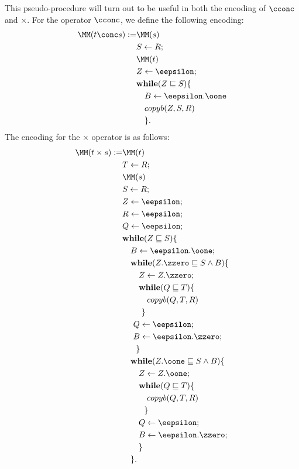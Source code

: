 This pseudo-procedure will turn out to be useful
in both the encoding of
{$\cconc$} and $\times$.
For the operator
{$\cconc$},
we define the following encoding:
\begin{align*}
\MM(t\conc s) := &\MM(s) \\
%
& S\leftarrow R; \\
%
& \MM(t) \\
%
& Z \leftarrow {\eepsilon}; \\
%
& \mathbf{while}(Z\sqsubseteq S)\{ \\
& \ \ \ B\leftarrow {\eepsilon.\oone} \\
& \ \ \ copyb(Z,S,R) \\
& \ \ \ \}.
\end{align*}
%
%
%
The encoding for the $\times$ operator is
as follows:
\begin{align*}
\MM(t\times s) := &\MM(t) \\
%
&T \leftarrow R; \\
%
& \MM(s) \\
%
& S \leftarrow R; \\
%
& Z \leftarrow {\eepsilon}; \\
%
&R \leftarrow {\eepsilon}; \\
%
&Q \leftarrow {\eepsilon}; \\
%
& \mathbf{while}(Z\sqsubseteq S) \{ \\
%
& \ \ \ B \leftarrow {\eepsilon.\oone}; \\
%
& \ \ \ \mathbf{while}(Z.{\zzero}
\sqsubseteq S\wedge B) \{ \\
%
& \ \ \ \ \ \ Z \leftarrow Z.{\zzero}; \\
%
& \ \ \ \ \ \ \mathbf{while}(Q\sqsubseteq T)\{ \\
%
& \ \ \ \ \ \ \ \ \ copyb(Q,T,R) \\
%
& \ \ \ \ \ \ \ \} \\
%
& \ \ \ \ Q\leftarrow \eepsilon; \\
%
& \ \ \ \ B \leftarrow {\eepsilon.\zzero}; \\
%
& \ \ \ \ \ \} \\
%
& \ \ \ \mathbf{while}(Z.{\oone}
\sqsubseteq S\wedge B)\{ \\
%
& \ \ \ \ \ \ Z \leftarrow Z.{\oone}; \\
%
& \ \ \ \ \ \ \mathbf{while}(Q\sqsubseteq T)\{ \\
%
& \ \ \ \ \ \ \ \ \ copyb(Q,T,R) \\
%
& \ \ \ \ \ \ \ \ \} \\
%
& \ \ \ \ \ \ Q \leftarrow \eepsilon; \\
%
& \ \ \ \ \ \ B \leftarrow {\eepsilon.\zzero}; \\
%
& \ \ \ \ \ \ \} \\
%
& \ \ \ \}.
\end{align*}








